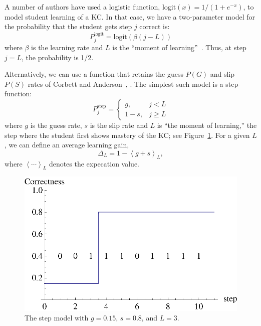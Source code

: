 \documentclass[11pt,letterpaper]{article}
\begin{document}
A number of authors have used a logistic function, 
$\mathrm{logit}(x)=1/\left(1+e^{-x}\right)$, to 
model student learning of a KC.  In that case, we have a two-parameter
model for the probability that the student gets step $j$ correct is:
%
\begin{equation}
               P_j^\mathrm{logit} = \mathrm{logit}\left(\beta (j-L)\right)
\end{equation}
%
where $\beta$ is the learning rate and $L$ is the ``moment
of learning''~\cite{aha}.  
Thus, at step $j=L$, the probability is 1/2.

Alternatively, we can use a function that retains the 
guess $P(G)$ and slip $P(S)$ rates of Corbett and 
Anderson~\cite{anderson}, .
The simplest such model is a step-function:
%
\begin{equation}
               P_j^\mathrm{step} = \left\{\begin{array}{cc}
                                       g,& j<L\\
				       1-s,& j\ge L
                                    \end{array}\right. \label{step}
\end{equation}
where $g$ is the guess rate, $s$ is the slip rate and 
$L$ is ``the moment of learning,'' the step where the student
first shows mastery of the KC; see Figure~\ref{stepf}.
For a given $L$, we can define an average learning gain,
%
\begin{equation}
         \Delta_L = 1- \left\langle g+s \right\rangle_L ,
\end{equation}
%
where $\left\langle \cdots \right\rangle_L$ denotes the
expecation value.
\begin{figure}
\includegraphics{step.eps}
\caption{The step model with $g=0.15$, $s=0.8$, and $L=3$.}
         \label{stepf}
\end{figure}
\end{document}
